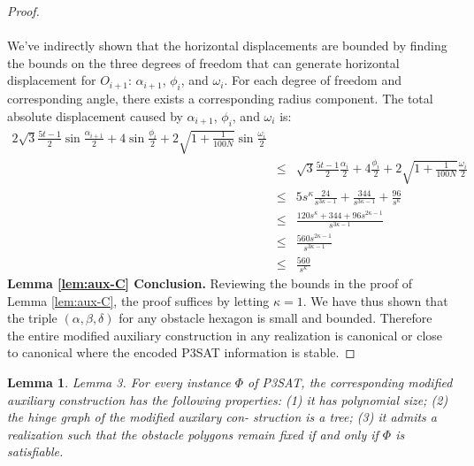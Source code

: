 \documentclass[10pt]{CSUNthesis}
\theoremstyle{plain}%
\newtheorem{lem}{Lemma}
\theoremstyle{definition}
\theoremstyle{remark}
\begin{document}
\begin{proof}
\paragraph{}  We've indirectly shown that the horizontal displacements are bounded by finding the bounds on the three degrees of freedom that can generate horizontal displacement for $O_{i+1}$: $\alpha_{i+1}$, $\phi_i$, and $\omega_i$.  
For each degree of freedom and corresponding angle, there exists a corresponding radius component.  
The total absolute displacement caused by $\alpha_{i+1}$, $\phi_i$, and $\omega_i$ is:
\begin{eqnarray*}
2\sqrt{3} \frac{5t-1}{2} \sin \frac{\alpha_{i+1}}{2} + 4 \sin \frac{\phi_i}{2} + 2 \sqrt{1 + \frac{1}{100N}} \sin \frac{\omega_i}{2}  \\
&\leq& \sqrt{3} \frac{5t-1}{2} \frac{\alpha_i}{2} + 4 \frac{\phi_i}{2} + 2 \sqrt{1 + \frac{1}{100N}} \frac{\omega_i}{2}  \\  
&\leq&  5s^\kappa \frac{24}{s^{3\kappa-1}} +  \frac{344}{s^{3\kappa - 1}} +  \frac{96}{s^\kappa}\\
&\leq& \frac{120s^\kappa + 344 + 96 s^{2\kappa - 1} }{s^{3\kappa - 1}} \\
&\leq& \frac{560 s^{2\kappa - 1} }{s^{3\kappa - 1}}\\
&\leq& \frac{560  }{s^\kappa }
\end{eqnarray*}\textbf{Lemma \ref{lem:aux-C} Conclusion.} 
Reviewing the bounds in the proof of Lemma \ref{lem:aux-C}, the proof suffices by letting $\kappa = 1$.  
We have thus shown that the triple $(\alpha, \beta, \delta)$ for any obstacle hexagon is small and bounded.  
Therefore the entire modified auxiliary construction in any realization is canonical or close to canonical where the encoded P3SAT information is stable.
\end{proof}\begin{lem}\label{lem:lePieceDuResistance}
Lemma 3. For every instance $\Phi$ of P3SAT, the corresponding modified auxiliary construction
has the following properties: (1) it has polynomial size; (2) the hinge graph of the modified auxilary con-
struction is a tree; (3) it admits a realization such that the obstacle polygons remain fixed if and only if $\Phi$ is
satisfiable.
\end{lem}
\end{document}
